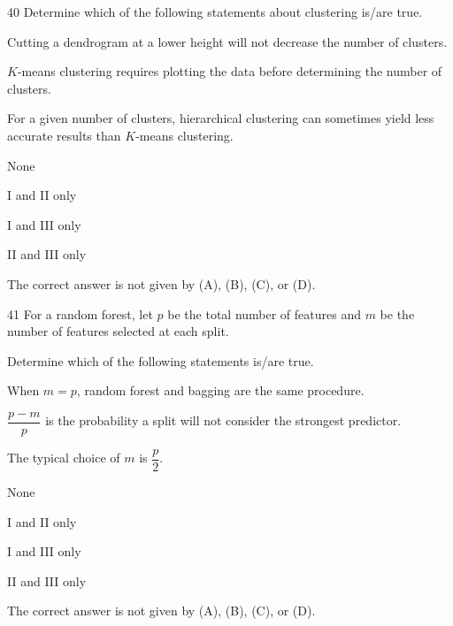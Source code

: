 \begin{question}{40}
Determine which of the following statements about clustering is/are true.
\begin{statements}
\item Cutting a dendrogram at a lower height will not decrease the number of clusters.
\item $K$-means clustering requires plotting the data before determining the number of clusters.
\item For a given number of clusters, hierarchical clustering can sometimes yield less accurate results than $K$-means clustering.
\end{statements}

\begin{choices}
\item None
\item I and II only
\item I and III only
\item II and III only
\item The correct answer is not given by (A), (B), (C), or (D).
\end{choices}
\end{question}

\begin{question}{41}
For a random forest, let $p$ be the total number of features and $m$ be the number of features selected at each split.

Determine which of the following statements is/are true.
\begin{statements}
\item When $m = p$, random forest and bagging are the same procedure.
\item $\dfrac{p-m}{p}$ is the probability a split will not consider the strongest predictor.
\item The typical choice of $m$ is $\dfrac{p}{2}$.
\end{statements}

\begin{choices}
\item None
\item I and II only
\item I and III only
\item II and III only
\item The correct answer is not given by (A), (B), (C), or (D).
\end{choices}
\end{question}

